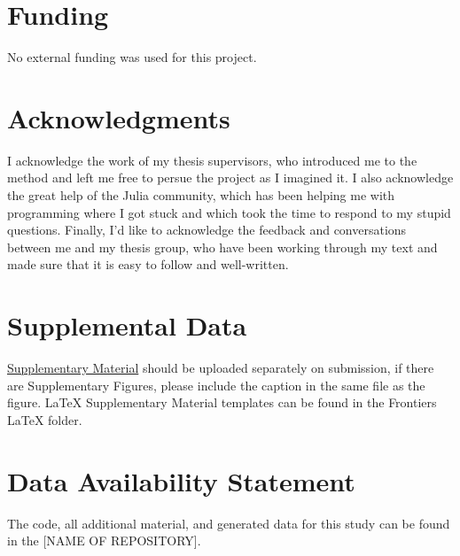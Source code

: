 \documentclass[utf8]{FrontiersinVancouver}
\begin{document}
\section*{Funding}
No external funding was used for this project.

\section*{Acknowledgments}
I acknowledge the work of my thesis supervisors, who introduced me to the method and left me free to persue the project as I imagined it. I also acknowledge the great help of the Julia community, which has been helping me with programming where I got stuck and which took the time to respond to my stupid questions. Finally, I'd like to acknowledge the feedback and conversations between me and my thesis group, who have been working through my text and made sure that it is easy to follow and well-written.

\section*{Supplemental Data}
 \href{http://home.frontiersin.org/about/author-guidelines#SupplementaryMaterial}{Supplementary Material} should be uploaded separately on submission, if there are Supplementary Figures, please include the caption in the same file as the figure. LaTeX Supplementary Material templates can be found in the Frontiers LaTeX folder.

\section*{Data Availability Statement}
The code, all additional material, and generated data for this study can be found in the [NAME OF REPOSITORY]{}.

\end{document}
